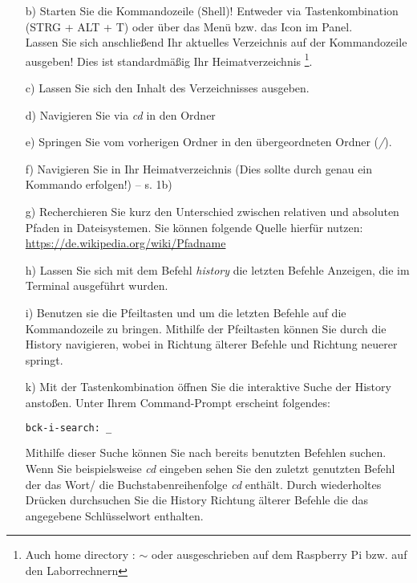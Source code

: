 \documentclass[paper=a4,fontsize=11pt]{scrartcl}%
\numberwithin{equation}{section}
\begin{document}
{\begin{enumerate}
\begin{itemize}
Anmerkung: Einige Aufgaben benötigen mehr als nur genau ein Kommando!
		\item[b)] Starten Sie die Kommandozeile (Shell)! Entweder via Tastenkombination  (STRG + ALT + T) oder über das Menü bzw. das Icon im Panel.\\
		Lassen Sie sich anschließend Ihr aktuelles Verzeichnis auf der Kommandozeile ausgeben! Dies ist standardmäßig Ihr Heimatverzeichnis \footnote{Auch \glqq home directory \grqq: $\sim$ oder ausgeschrieben  auf dem Raspberry Pi bzw.  auf den Laborrechnern}.
		\item[c)] Lassen Sie sich den Inhalt des Verzeichnisses ausgeben.
		\item[d)] Navigieren Sie via \emph{cd} in den Ordner 
		\item[e)] Springen Sie vom vorherigen Ordner in den übergeordneten Ordner (\emph{/}).
		\item[f)] Navigieren Sie in Ihr Heimatverzeichnis (Dies sollte durch genau ein Kommando erfolgen!) -- s. 1b)
		\item[g)] Recherchieren Sie kurz den Unterschied zwischen relativen und absoluten Pfaden in Dateisystemen. Sie können folgende Quelle hierfür nutzen: \url{https://de.wikipedia.org/wiki/Pfadname}
		\item[h)] Lassen Sie sich mit dem Befehl \emph{history} die letzten Befehle Anzeigen, die im Terminal ausgeführt wurden. 
		\item[i)] Benutzen sie die Pfeiltasten \keys{\arrowkeyup} und \keys{\arrowkeydown} um die letzten Befehle auf die Kommandozeile zu bringen. Mithilfe der Pfeiltasten können Sie durch die History navigieren, wobei \keys{\arrowkeyup} in Richtung älterer Befehle und \keys{\arrowkeydown} Richtung neuerer springt.
		\item[k)] Mit der Tastenkombination  öffnen Sie die interaktive Suche der History anstoßen. Unter Ihrem Command-Prompt erscheint folgendes:\\
		\begin{lstlisting}[style=Bash, language=Bash]
bck-i-search: _
		\end{lstlisting}
		Mithilfe dieser Suche können Sie nach bereits benutzten Befehlen suchen. Wenn Sie beispielsweise \emph{cd} eingeben sehen Sie den zuletzt genutzten Befehl der das Wort/ die Buchstabenreihenfolge \emph{cd} enthält. Durch wiederholtes Drücken durchsuchen Sie die History Richtung älterer Befehle die das angegebene Schlüsselwort enthalten.\\

\end{itemize}
\end{enumerate}}
\end{document}
